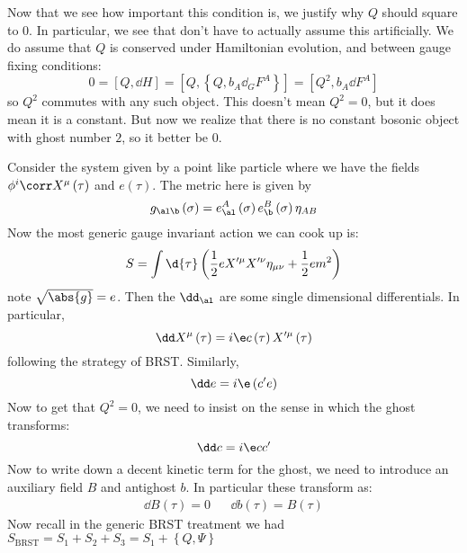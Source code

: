 \documentclass{booc}
\begin{document}
Now that we see how important this condition is, we justify why $Q$ should square to $0$.
In particular, we see that don't have to actually assume this artificially.
We do assume that $Q$ is conserved under Hamiltonian evolution,
and between gauge fixing conditions:
\begin{equation}
0 = \left[ Q , \dd H \right] = 
\left[ Q , \left\{ Q , b_A \dd_G F^A  \right\} \right]
=\left[ Q^2 , b_A \dd F^A \right]
\end{equation}
so $Q^2$ commutes with any such object. 
This doesn't mean $Q^2= 0$, but it does mean it is a constant. 
But now we realize that there is no constant bosonic object with ghost number $2$, 
so it better be $0$.

\begin{exm}
Consider the system given by a point like particle where we have
the fields
$\phi^i \corr X^\mu\left( \tau \right)$ and
$e\left( \tau \right)$.
The metric here is given by 
\begin{equation}
g_{\al\b}\left( \sigma \right) = 
e_\al^A\left( \sigma \right) e_\b^B\left( \sigma \right)\eta_{AB}
\end{equation}
Now the most generic gauge invariant action we can cook up is:
\begin{equation}
S = \int \d{\tau} \left( 
\frac{1}{2} e
X'^\mu X'^\nu \eta_{\mu\nu}
+ \frac{1}{2} em^2
\right)
\end{equation}
note $\sqrt{\abs{g}} = e$.
Then the $\dd_\al$ are some single dimensional differentials.
In particular, 
\begin{equation}
\dd X^\mu\left( \tau \right) = i\e c\left( \tau \right) X'^\mu\left( \tau \right)
\end{equation}
following the strategy of BRST. Similarly, 
\begin{equation}
\dd e = i\e \left( c' e \right)
\end{equation}
Now to get that $Q^2 = 0$, we need to insist on the sense in which the ghost transforms:
\begin{equation}
\dd c = i \e c c'
\end{equation}
Now to write down a decent kinetic term for the ghost, we need to introduce an auxiliary field $B$
and antighost $b$. In particular these transform as:
\begin{align}
\dd B\left( \tau \right) = 0
&& \dd b\left( \tau \right) = B\left( \tau \right)
\end{align}
Now recall in the generic BRST treatment we had
$S_{\text{BRST}} = S_1 + S_2 + S_3 = S_1 + \left\{ Q , \Psi \right\}$

\end{exm}
\end{document}
